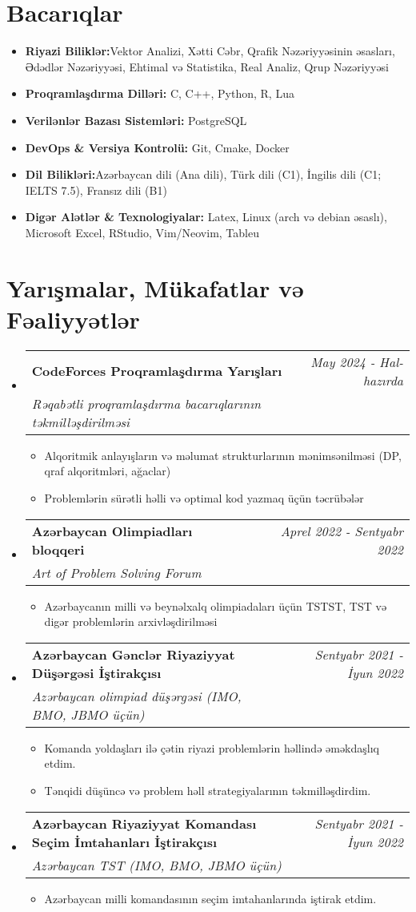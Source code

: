 \documentclass[a4paper,11pt]{article}
\makeatletter
\newcommand{\resumeItem}[2]{
\item{
        \textbf{#1}{\hspace{0.5mm}#2 \vspace{-0.5mm}}
    }
}
\newcommand{\resumeProject}[4]{
    \vspace{0.5mm}
\item
    \begin{tabular*}{0.98\textwidth}[t]{l@{\extracolsep{\fill}}r}
        \textbf{#1} & \textit{\footnotesize{#3}} \\
        \footnotesize{\textit{#2}} & \footnotesize{#4}
    \end{tabular*}
    \vspace{-2.4mm}
}
\newcommand{\resumeSubItem}[2]{\resumeItem{#1}{#2}\vspace{-4pt}}
\newcommand{\resumeSubHeadingListStart}{
\begin{itemize}[leftmargin=*,labelsep=1mm]}
\newcommand{\resumeHeadingSkillStart}{
        \begin{itemize}[leftmargin=*,itemsep=1.7mm, rightmargin=2ex]}
\newcommand{\resumeItemListStart}{
                \begin{itemize}[leftmargin=*,labelsep=1mm,itemsep=0.5mm]}
\newcommand{\resumeSubHeadingListEnd}{
                    \end{itemize}\vspace{2mm}}
\newcommand{\resumeHeadingSkillEnd}{
            \end{itemize}\vspace{-2mm}}
\newcommand{\resumeItemListEnd}{
    \end{itemize}\vspace{-2mm}}
\makeatother
\begin{document}
\section{\textbf{Bacarıqlar}}
\resumeHeadingSkillStart
\resumeSubItem{Riyazi Biliklər:}
{Vektor Analizi, Xətti Cəbr, Qrafik Nəzəriyyəsinin əsasları, Ədədlər Nəzəriyyəsi, Ehtimal və Statistika, Real Analiz, Qrup Nəzəriyyəsi}
\resumeSubItem{Proqramlaşdırma Dilləri:}
{ C, C++, Python, R, Lua}
\resumeSubItem{Verilənlər Bazası Sistemləri:}
{ PostgreSQL}
\resumeSubItem{DevOps \& Versiya Kontrolü:}
{ Git, Cmake, Docker }
\resumeSubItem{Dil Bilikləri:}
{Azərbaycan dili (Ana dili), Türk dili (C1), İngilis dili (C1; IELTS 7.5), Fransız dili (B1)}
\resumeSubItem{Digər Alətlər \& Texnologiyalar:}
{ Latex, Linux (arch və debian əsaslı), Microsoft Excel, RStudio, Vim/Neovim, Tableu}
\resumeHeadingSkillEnd

\section{\textbf{Yarışmalar, Mükafatlar və Fəaliyyətlər}}
\resumeSubHeadingListStart
\resumeProject
{CodeForces Proqramlaşdırma Yarışları}
{Rəqabətli proqramlaşdırma bacarıqlarının təkmilləşdirilməsi}
{May 2024 - Hal-hazırda}
{{}\href{https://codeforces.com/profile/JosephMehdiyev}{\textcolor{darkblue}{\faIcon{globe}}}}
\resumeItemListStart
\item Alqoritmik anlayışların və məlumat strukturlarının mənimsənilməsi (DP, qraf alqoritmləri, ağaclar)
\item Problemlərin sürətli həlli və optimal kod yazmaq üçün təcrübələr
\resumeItemListEnd

\resumeProject
{Azərbaycan Olimpiadları bloqqeri}
{Art of Problem Solving Forum}
{Aprel 2022 - Sentyabr 2022}
{{}\href{https://artofproblemsolving.com/community/user/948405}{\textcolor{darkblue}{\faIcon{globe}}}}
\resumeItemListStart
\item Azərbaycanın milli və beynəlxalq olimpiadaları üçün TSTST, TST və digər problemlərin arxivləşdirilməsi
\resumeItemListEnd

\resumeProject
{Azərbaycan Gənclər Riyaziyyat Düşərgəsi İştirakçısı}
{Azərbaycan olimpiad düşərgəsi (IMO, BMO, JBMO üçün)}
{Sentyabr 2021 - İyun 2022}
{}
\resumeItemListStart
\item Komanda yoldaşları ilə çətin riyazi problemlərin həllində əməkdaşlıq etdim.
\item Tənqidi düşüncə və problem həll strategiyalarının təkmilləşdirdim.
\resumeItemListEnd

\resumeProject
{Azərbaycan Riyaziyyat Komandası Seçim İmtahanları İştirakçısı}
{Azərbaycan TST (IMO, BMO, JBMO üçün)}
{Sentyabr 2021 - İyun 2022}
{}
\resumeItemListStart
\item Azərbaycan milli komandasının seçim imtahanlarında iştirak etdim.
\resumeItemListEnd
\resumeSubHeadingListEnd

\end{document}
